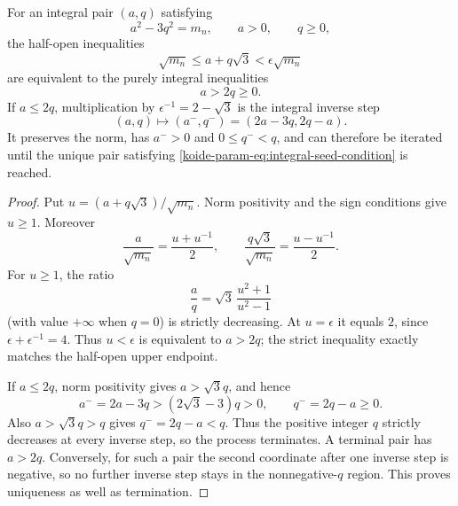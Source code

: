 \begin{lemma}
\label{koide-param-lem:integral-seed-descent}
For an integral pair $(a,q)$ satisfying
\[
 a^2-3q^2=m_n,\qquad a>0,\qquad q\geq0,
\]
the half-open inequalities
\[
 \sqrt{m_n}\leq a+q\sqrt3<\epsilon\sqrt{m_n}
\]
are equivalent to the purely integral inequalities
\begin{equation}
 a>2q\geq0.
 \label{koide-param-eq:integral-seed-condition}
\end{equation}
If $a\leq2q$, multiplication by $\epsilon^{-1}=2-\sqrt3$ is the
integral inverse step
\begin{equation}
 (a,q)\longmapsto(a^-,q^-)=(2a-3q,2q-a).
 \label{koide-param-eq:inverse-descent}
\end{equation}
It preserves the norm, has $a^->0$ and $0\leq q^-<q$, and can therefore
be iterated until the unique pair satisfying \eqref{koide-param-eq:integral-seed-condition}
is reached.
\end{lemma}

\begin{proof}
Put $u=(a+q\sqrt3)/\sqrt{m_n}$.  Norm positivity and the sign conditions
give $u\geq1$.  Moreover
\[
 \frac a{\sqrt{m_n}}=\frac{u+u^{-1}}2,
 \qquad
 \frac{q\sqrt3}{\sqrt{m_n}}=\frac{u-u^{-1}}2.
\]
For $u\geq1$, the ratio
\[
 \frac aq=\sqrt3\,\frac{u^2+1}{u^2-1}
\]
(with value $+\infty$ when $q=0$) is strictly decreasing.  At
$u=\epsilon$ it equals $2$, since
$\epsilon+\epsilon^{-1}=4$.  Thus $u<\epsilon$ is equivalent to $a>2q$;
the strict inequality exactly matches the half-open upper endpoint.

If $a\leq2q$, norm positivity gives $a>\sqrt3q$, and hence
\[
 a^-=2a-3q>(2\sqrt3-3)q>0,
 \qquad q^-=2q-a\geq0.
\]
Also $a>\sqrt3q>q$ gives $q^-=2q-a<q$.  Thus the positive integer $q$
strictly decreases at every inverse step, so the process terminates.  A
terminal pair has $a>2q$.  Conversely, for such a pair the second
coordinate after one inverse step is negative, so no further inverse step
stays in the nonnegative-$q$ region.  This proves uniqueness as well as
termination.
\end{proof}

